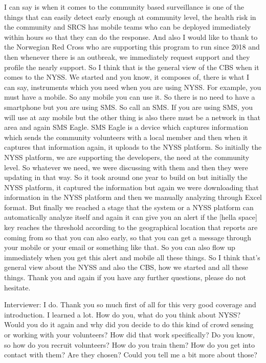 I can say is when it comes to the community based surveillance is one of the things that can easily detect early enough at community level, the health risk in the community and SRCS has mobile teams who can be deployed immediately within hours so that they can do the response. And also I would like to thank to the Norwegian Red Cross who are supporting this program to run since 2018 and then whenever there is an outbreak, we immediately request support and they profile the nearly support. So I think that is the general view of the CBS when it comes to the NYSS. We started and you know, it composes of, there is what I can say, instruments which you need when you are using NYSS. For example, you must have a mobile. So any mobile you can use it. So there is no need to have a smartphone but you are using SMS. So call an SMS. If you are using SMS, you will use at any mobile but the other thing is also there must be a network in that area and again SMS Eagle. SMS Eagle is a device which captures information which sends the community volunteers with a local member and then when it captures that information again, it uploads to the NYSS platform. So initially the NYSS platform, we are supporting the developers, the need at the community level. So whatever we need, we were discussing with them and then they were updating in that way. So it took around one year to build on but initially the NYSS platform, it captured the information but again we were downloading that information in the NYSS platform and then we manually analyzing through Excel format. But finally we reached a stage that the system or a NYSS platform can automatically analyze itself and again it can give you an alert if the [hella space] key reaches the threshold according to the geographical location that reports are coming from so that you can also early, so that you can get a message through your mobile or your email or something like that. So you can also flow up immediately when you get this alert and mobile all these things. So I think that's general view about the NYSS and also the CBS, how we started and all these things. Thank you and again if you have any further questions, please do not hesitate.

Interviewer:   I do. Thank you so much first of all for this very good coverage and introduction. I learned a lot. How do you, what do you think about NYSS? Would you do it again and why did you decide to do this kind of crowd sensing or working with your volunteers? How did that work specifically? Do you know, so how do you recruit volunteers? How do you train them? How do you get into contact with them? Are they chosen? Could you tell me a bit more about those? 

